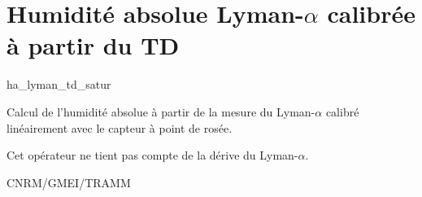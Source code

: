 %
\section{Humidit\'e absolue Lyman-$\alpha$ calibr\'ee
\`a partir du TD}

 {\sf ha\_lyman\_td\_satur}

Calcul de l'humidit\'e absolue \`a partir de la mesure du
Lyman-$\alpha$ calibr\'e lin\'eairement avec le capteur
\`a point de ros\'ee.

\bigskip







Cet op\'erateur ne tient pas compte de la d\'erive du
Lyman-$\alpha$.

CNRM/GMEI/TRAMM

